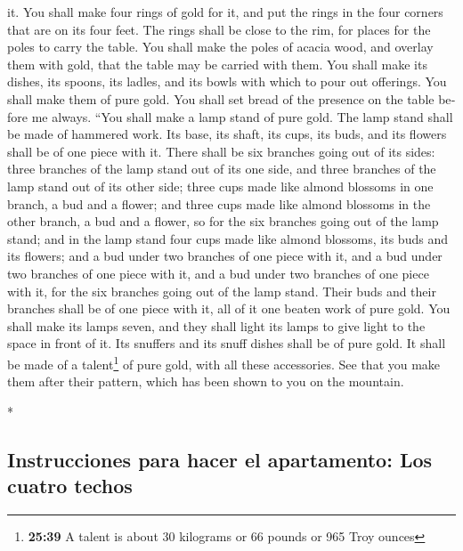 \begin{paracol}{2}
\begin{otherlanguage}{english}
it.  You shall make four rings of gold for it, and put
the rings in the four corners that are on its four feet. 
The rings shall be close to the rim, for places for the poles to carry
the table.  You shall make the poles of acacia wood, and
overlay them with gold, that the table may be carried with them.
 You shall make its dishes, its spoons, its ladles, and
its bowls with which to pour out offerings. You shall make them of pure
gold.  You shall set bread of the presence on the table
before me always.  ``You shall make a lamp stand of pure
gold. The lamp stand shall be made of hammered work. Its base, its
shaft, its cups, its buds, and its flowers shall be of one piece with
it.  There shall be six branches going out of its sides:
three branches of the lamp stand out of its one side, and three branches
of the lamp stand out of its other side;  three cups made
like almond blossoms in one branch, a bud and a flower; and three cups
made like almond blossoms in the other branch, a bud and a flower, so
for the six branches going out of the lamp stand;  and in
the lamp stand four cups made like almond blossoms, its buds and its
flowers;  and a bud under two branches of one piece with
it, and a bud under two branches of one piece with it, and a bud under
two branches of one piece with it, for the six branches going out of the
lamp stand.  Their buds and their branches shall be of
one piece with it, all of it one beaten work of pure gold.
 You shall make its lamps seven, and they shall light its
lamps to give light to the space in front of it.  Its
snuffers and its snuff dishes shall be of pure gold.  It
shall be made of a talent\footnote{\textbf{25:39} A talent is about 30
  kilograms or 66 pounds or 965 Troy ounces} of pure gold, with all
these accessories.  See that you make them after their
pattern, which has been shown to you on the mountain.

\end{otherlanguage}

\switchcolumn[0]*

\hypertarget{instrucciones-para-hacer-el-apartamento-los-cuatro-techos}{%
\subsection{Instrucciones para hacer el apartamento: Los cuatro
techos}\label{instrucciones-para-hacer-el-apartamento-los-cuatro-techos}}


\end{paracol}
